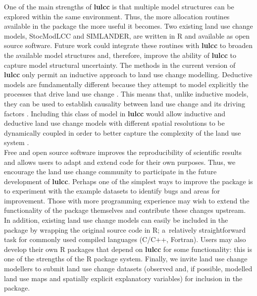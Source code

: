 \documentclass{icldt}\usepackage[]{graphicx}\usepackage[]{color}
\begin{document}
One of the main strengths of \textbf{lulcc} is that multiple model structures can be explored within the same environment. Thus, the more allocation routines available in the package the more useful it becomes. Two existing land use change models, StocModLCC and SIMLANDER, are written in R and available as open source software. Future work could integrate these routines with \textbf{lulcc} to broaden the available model structures and, therefore, improve the ability of \textbf{lulcc} to capture model structural uncertainty. The methods in the current version of \textbf{lulcc} only permit an inductive approach to land use change modelling. Deductive models are fundamentally different because they attempt to model explicitly the processes that drive land use change \citep{perez-vega2012}. This means that, unlike inductive models, they can be used to establish causality between land use change and its driving factors \citep{overmars2007}. Including this class of model in \textbf{lulcc} would allow inductive and deductive land use change models with different spatial resolutions to be dynamically coupled in order to better capture the complexity of the land use system \citep{moreira2009}. \\

Free and open source software improves the reproducibility of scientific results and allows users to adapt and extend code for their own purposes. Thus, we encourage the land use change community to participate in the future development of \textbf{lulcc}. Perhaps one of the simplest ways to improve the package is to experiment with the example datasets to identify bugs and areas for improvement. Those with more programming experience may wish to extend the functionality of the package themselves and contribute these changes upstream. In addition, existing land use change models can easily be included in the package by wrapping the original source code in R; a~relatively straightforward task for commonly used compiled languages (C/C++, Fortran). Users may also develop their own R packages that depend on \textbf{lulcc} for some functionality: this is one of the strengths of the R package system. Finally, we invite land use change modellers to submit land use change datasets (observed and, if possible, modelled land use maps and spatially explicit explanatory variables) for inclusion in the package. \\

\end{document}

